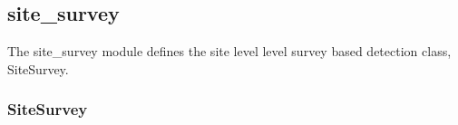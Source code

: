 \documentclass[letterpaper,10pt,english]{sphinxmanual}
\begin{document}
\subsection{site\_survey}
\label{\detokenize{index:module-feast.DetectionModules.site_survey}}\label{\detokenize{index:site-survey}}
The site\_survey module defines the site level level survey based detection class, SiteSurvey.


\subsubsection{SiteSurvey}
\label{\detokenize{index:sitesurvey}}
\end{document}
